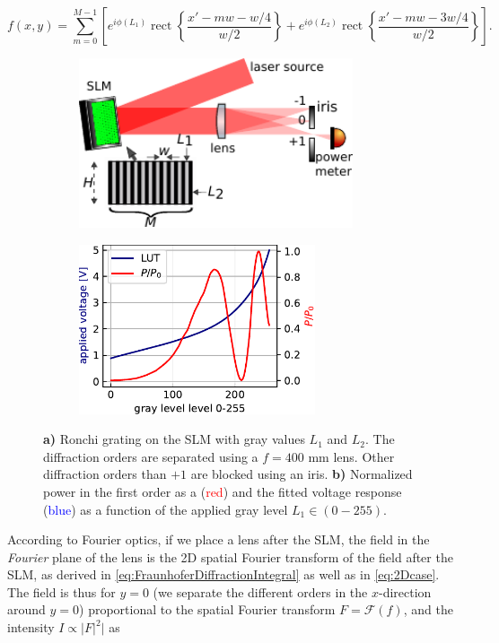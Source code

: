 \begin{equation}\label{eq:FieldAfterSLM}
    f(x,y) = \sum_{m=0}^{M-1} \left[
    e^{i \phi(L_1)} \operatorname{rect}\left\{\frac{x'-m w - w/4}{w/2}\right\} + 
    e^{i \phi(L_2)}\operatorname{rect}\left\{\frac{x'- m w - 3 w/4}{w/2}\right\}
    \right].
\end{equation}

\begin{figure}
	\begin{subfigure}{.51\linewidth}
		\flushleft
		\includegraphics[height=5cm]{figures/LUTcalibrationSetup.pdf}
		\caption{}
		\label{fig:LUTCalibrationSetup}
	\end{subfigure}
	\hfill
	\begin{subfigure}{.48\linewidth}
		\flushright
		\includegraphics[height=5cm]{figures/LUTplot.pdf}
		\caption{}
		\label{fig:LUTcalibration}
	\end{subfigure}
	\caption{\textsf{\textbf{a)}} Ronchi grating on the SLM with gray values $L_1$ and $L_2$. 
	The diffraction orders are separated using a $f=400$ mm lens. 
	Other diffraction orders than $+1$ are blocked using an iris. 
	\textsf{\textbf{b)}} Normalized power in the first order as a (\textcolor{red}{red}) and the fitted voltage response (\textcolor{blue}{blue}) as a function of the applied gray level $L_1 \in (0-255)$.}
\end{figure}

\noindent According to Fourier optics, if we place a lens after the SLM, the field in the \textit{Fourier} plane of the lens is the 2D spatial Fourier transform of the field after the SLM, as derived in \cref{eq:FraunhoferDiffractionIntegral} as well as in \cref{eq:2Dcase}.
The field is thus for $y=0$ (we separate the different orders in the $x$-direction around $y=0$) proportional to the spatial Fourier transform $F = \mathcal{F}(f)$, and the intensity $I\propto |F|^2|$ as \cite{Zhang1994}

